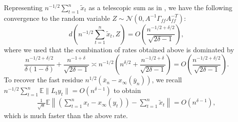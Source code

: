 Representing $n^{-1/2} \sum_{t=1}^n \tilde{x}_t$ as a telescopic sum as in \citep{srikant2024CLT}, we have the following convergence to the random variable $Z \sim \mathcal{N}(0, A^{-1} \Gamma_{ff} A_{ff}^{-T})$:
\begin{equation}
    d\left(n^{-1/2} \sum_{t=1}^n \tilde{x}_t, Z\right) = O\left( \frac{n^{-1/2 + \delta / 2}}{\sqrt{2 \delta - 1}}\right) ,
\end{equation}
where we used that the combination of rates obtained above is dominated by
\begin{equation}
    \frac{n^{-1/2 + \delta/2}}{\delta (1 - \delta)}  + \frac{n^{-1 + \delta}}{\sqrt{2 \delta - 1}} \asymp
    n^{-1/2}\left(
        n^{\delta / 2} + \frac{n^{-1/2 + \delta}}{\sqrt{2 \delta -1}}
    \right)
    = 
    O\left( \frac{n^{-1/2 + \delta / 2}}{\sqrt{2 \delta - 1}}\right)
    .
\end{equation}
To recover the fast residue $n^{1/2} (\bar{x}_n - x_\infty (\bar{y}_n))$,
we recall $n^{-1/2} \sum_{t=1}^n \mathbb{E}\lVert L_t \hat{y}_t \rVert = O(n^{\delta - 1})$ to obtain
\begin{align*}
    \frac{1}{\sqrt{n}} \mathbb{E} \left\lVert \left(\sum_{t=1}^n x_t - x_\infty (y_t)\right) - \sum_{t=1}^n \tilde{x}_t \right\rVert = O(n^{\delta - 1}) ,
\end{align*}
which is much faster than the above rate.


